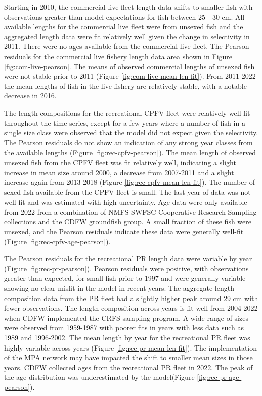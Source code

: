 \documentclass[11pt,
  letterpaper,
]{article}
\begin{document}
Starting in 2010, the commercial live fleet length data shifts to smaller fish with observations greater than model expectations for fish between 25 - 30 cm. All available lengths for the commercial live fleet were from unsexed fish and the aggregated length data were fit relatively well given the change in selectivity in 2011. There were no ages available from the commercial live fleet. The Pearson residuals for the commercial live fishery length data area shown in Figure \ref{fig:com-live-pearson}. The means of observed commercial lengths of unsexed fish were not stable prior to 2011 (Figure \ref{fig:com-live-mean-len-fit}). From 2011-2022 the mean lengths of fish in the live fishery are relatively stable, with a notable decrease in 2016.

The length compositions for the recreational CPFV fleet were relatively well fit throughout the time series, except for a few years where a number of fish in a single size class were observed that the model did not expect given the selectivity. The Pearson residuals do not show an indication of any strong year classes from the available lengths (Figure \ref{fig:rec-cpfv-pearson}). The mean length of observed unsexed fish from the CPFV fleet was fit relatively well, indicating a slight increase in mean size around 2000, a decrease from 2007-2011 and a slight increase again from 2013-2018 (Figure \ref{fig:rec-cpfv-mean-len-fit}). The number of sexed fish available from the CPFV fleet is small. The last year of data was not well fit and was estimated with high uncertainty. Age data were only available from 2022 from a combination of NMFS SWFSC Cooperative Research Sampling collections and the CDFW groundfish group. A small fraction of these fish were unsexed, and the Pearson residuals indicate these data were generally well-fit (Figure \ref{fig:rec-cpfv-age-pearson}).

The Pearson residuals for the recreational PR length data were variable by year (Figure \ref{fig:rec-pr-pearson}). Pearson residuals were positive, with observations greater than expected, for small fish prior to 1997 and were generally variable showing no clear misfit in the model in recent years. The aggregate length composition data from the PR fleet had a slightly higher peak around 29 cm with fewer observations. The length composition across years is fit well from 2004-2022 when CDFW implemented the CRFS sampling program. A wide range of sizes were observed from 1959-1987 with poorer fits in years with less data such as 1989 and 1996-2002. The mean length by year for the recreational PR fleet was highly variable across years (Figure \ref{fig:rec-pr-mean-len-fit}). The implementation of the MPA network may have impacted the shift to smaller mean sizes in those years. CDFW collected ages from the recreational PR fleet in 2022. The peak of the age distribution was underestimated by the model(Figure \ref{fig:rec-pr-age-pearson}).
\end{document}
